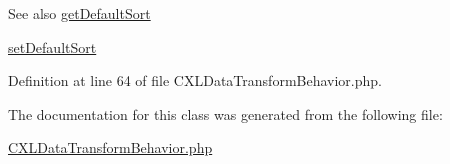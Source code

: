 \begin{DoxySeeAlso}{See also}
\hyperlink{classCXLDataTransformBehavior_afeb8c05903b3b31d7ec509c3e1628e52}{getDefaultSort} 

\hyperlink{classCXLDataTransformBehavior_ad6a3597dea15d20d248e402b0d162490}{setDefaultSort} 
\end{DoxySeeAlso}


Definition at line 64 of file CXLDataTransformBehavior.php.



The documentation for this class was generated from the following file:\begin{DoxyCompactItemize}
\item 
\hyperlink{CXLDataTransformBehavior_8php}{CXLDataTransformBehavior.php}\end{DoxyCompactItemize}
